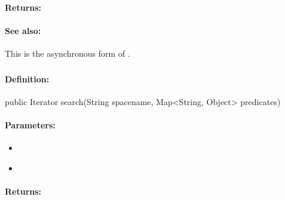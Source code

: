 \paragraph{Returns:}


\paragraph{See also:}  This is the asynchronous form of .

\pagebreak
\subsubsection{}
\label{api:java:search}


\paragraph{Definition:}
\begin{javacode}
public Iterator search(String spacename, Map<String, Object> predicates)
\end{javacode}

\paragraph{Parameters:}
\begin{itemize}[noitemsep]
\item {}\\

\item {}\\

\end{itemize}

\paragraph{Returns:}


\pagebreak
\subsubsection{}
\label{api:java:sorted_search}


